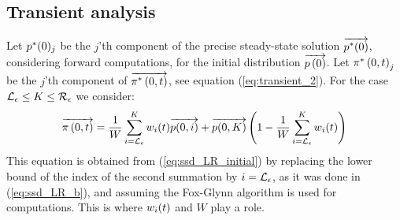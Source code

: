 \documentclass[a4paper,11pt]{article}
\newcommand{\SubSection}[1]{\subsection{#1}}
\begin{document}
	\SubSection{Transient analysis \label{ss:transient_ssd}}
		Let $p^{*}(0)_{j}$ be the $j$'th component of the precise steady-state solution $\overrightarrow{p^{*}(0)}$, considering forward computations, for the initial distribution $\overrightarrow{p \left( 0 \right)}$.  
		Let $\pi^{*} \left(0, t \right )_{j}$ be the $j$'th component of $\overrightarrow{\pi^{*} \left(0, t \right )}$, see equation (\ref{eq:transient_2}). For the case $\mathcal{L}_{\epsilon} \leq K \leq \mathcal{R}_{\epsilon}$ we consider:
		\begin{equation}
			\overrightarrow{\pi \left(0, t \right )} = \frac{1}{W} \sum_{i=\mathcal{L}_{\epsilon}}^{K}w_{i}(t) \overrightarrow{p(0,i)} + \overrightarrow{p(0,K)} \left(1- \frac{1}{W} \sum_{i=\mathcal{L}_{\epsilon}}^{K}w_{i}(t) \right) \label{eq:ssd_LR_m}
		\end{equation}
		This equation is obtained from (\ref{eq:ssd_LR_initial}) by replacing the lower bound of the index of the second summation by $i=\mathcal{L}_{\epsilon}$, as it was done in (\ref{eq:ssd_LR_b}), and assuming the Fox-Glynn algorithm is used for computations. This is where $w_{i}(t)$ and $W$ play a role.
			
\end{document}
